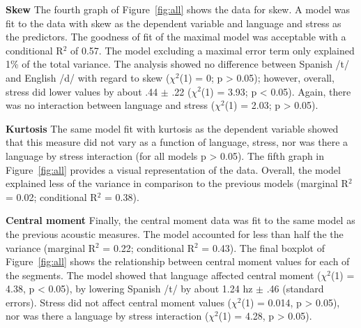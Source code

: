 \documentclass[a4paper,10pt,twocolumn]{article}\usepackage[]{graphicx}\usepackage[]{color}
\begin{document}
	\vspace{.025in}

	\noindent \textbf{Skew} %
	\label{par:skew}
	The fourth graph of Figure~\ref{fig:all} shows the data for skew. A model was fit to the data with skew as the dependent variable and language and stress as the predictors. The goodness of fit of the maximal model was acceptable with a conditional R$^2$ of 0.57. The model excluding a maximal error term only explained 1\% of the total variance. The analysis showed no difference between Spanish /t/ and English /d/ with regard to skew ($\chi$$^2$(1) = 0; p > 0.05); however, overall, stress did lower values by about .44 $\pm$ .22 ($\chi$$^2$(1) = 3.93; p < 0.05). Again, there was no interaction between language and stress ($\chi$$^2$(1) = 2.03; p > 0.05). 

	\vspace{.025in}

	\noindent \textbf{Kurtosis} %
	\label{par:kurtosis}
	The same model fit with kurtosis as the dependent variable showed that this measure did not vary as a function of language, stress, nor was there a language by stress interaction (for all models p > 0.05). The fifth graph in Figure~\ref{fig:all} provides a visual representation of the data. Overall, the model explained less of the variance in comparison to the previous models (marginal R$^2$ = 0.02; conditional R$^2$ = 0.38).

	\vspace{.025in}

	\noindent \textbf{Central moment} %
	\label{par:central_moment}
	Finally, the central moment data was fit to the same model as the previous acoustic measures. The model accounted for less than half the the variance (marginal R$^2$ = 0.22; conditional R$^2$ = 0.43). The final boxplot of Figure~\ref{fig:all} shows the relationship between central moment values for each of the segments. The model showed that language affected central moment ($\chi$$^2$(1) = 4.38, p < 0.05), by lowering Spanish /t/ by about 1.24 hz $\pm$ .46 (standard errors). Stress did not affect central moment values ($\chi$$^2$(1) = 0.014, p > 0.05), nor was there a language by stress interaction ($\chi$$^2$(1) = 4.28, p > 0.05).

\end{document}
